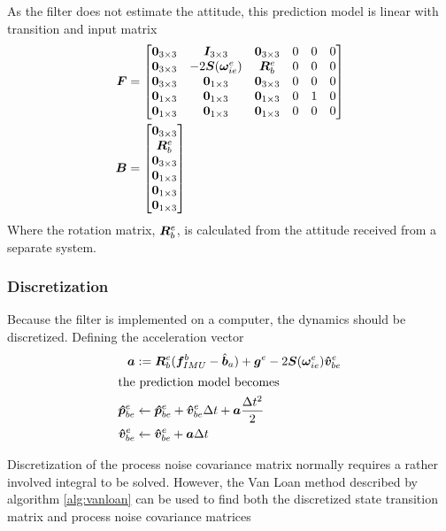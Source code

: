     As the filter does not estimate the attitude, this prediction model is linear with transition and input matrix
    \begin{align}
        \bm{F} &= 
        \begin{bmatrix}
            \bm{0}_{3\times3} & \bm{I}_{3\times3}          & \bm{0}_{3\times3}  & 0 & 0 & 0\\
            \bm{0}_{3\times3} & -2\bm{S}(\bm{\omega}_{ie}^e) & \bm{R}^e_b    & 0 & 0 & 0\\
            \bm{0}_{3\times3} & \bm{0}_{1\times3}     & \bm{0}_{3\times3}  & 0 & 0 & 0\\
            \bm{0}_{1\times3} & \bm{0}_{1\times3}     & \bm{0}_{1\times3}  & 0 & 1 & 0\\
            \bm{0}_{1\times3} & \bm{0}_{1\times3}     & \bm{0}_{1\times3}  & 0 & 0 & 0\\
        \end{bmatrix}\\
        \bm{B} &= 
        \begin{bmatrix}
            \bm{0}_{3\times3}\\
            \bm{R}^e_b\\
            \bm{0}_{3\times3}\\
            \bm{0}_{1\times3}\\
            \bm{0}_{1\times3}\\
            \bm{0}_{1\times3}
        \end{bmatrix}
    \end{align}
    Where the rotation matrix, $\bm{R}^e_b$, is calculated from the attitude received from a separate system.
    
\subsubsection{Discretization}
    Because the filter is implemented on a computer, the dynamics should be discretized. Defining the acceleration vector
    \begin{align}
        \bm{a} &:= \bm{R}^e_b(\bm{f}_{IMU}^b - \hat{\bm{b}}_a) + \bm{g}^e - 2\bm{S}(\bm{\omega}_{ie}^e)\bm{\hat{v}}^e_{be}\\
        \intertext{the prediction model becomes}
        \bm{\hat{p}}^e_{be} &\leftarrow \bm{\hat{p}}^e_{be} + \bm{\hat{v}}^e_{be}\Delta t + \bm{a}\frac{\Delta t^2}{2}\\
        \bm{\hat{v}}^e_{be} &\leftarrow \bm{\hat{v}}^e_{be} + \bm{a}\Delta t
    \end{align}
    
    Discretization of the process noise covariance matrix normally requires a rather involved integral to be solved. However, the Van Loan method described by algorithm \ref{alg:vanloan} can be used to find both the discretized state transition matrix and process noise covariance matrices \cite{van1978computing}


